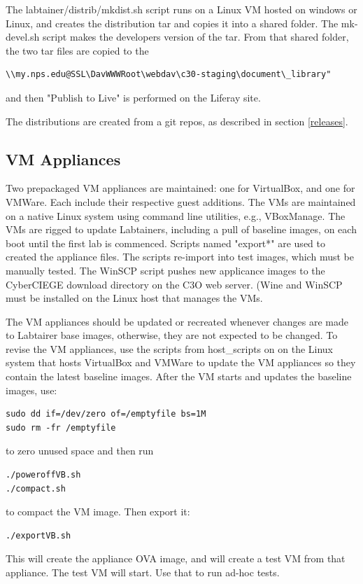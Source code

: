 \documentclass[12pt]{article}
\begin{document}
The labtainer/distrib/mkdist.sh script runs on a Linux VM hosted on windows or Linux, and creates the distribution tar 
and copies it into a shared folder.  The mk-devel.sh script makes the developers version of the tar.
From that shared folder, the two tar files are copied to the 
\begin{verbatim}
\\my.nps.edu@SSL\DavWWWRoot\webdav\c30-staging\document\_library" 
\end{verbatim}
\noindent and then "Publish to Live" is 
performed on the Liferay site.

The distributions are created from a git repos, as described in section \ref{releases}.

\subsection{VM Appliances}
Two prepackaged VM appliances are maintained: one for VirtualBox, and one for VMWare.  Each include
their respective guest additions.  The VMs are maintained on a native Linux system using command line
utilities, e.g., VBoxManage.  The VMs are rigged to update Labtainers, including a pull of
baseline images, on each boot until the first lab is commenced.  Scripts named "export*" are
used to created the appliance files.  The scripts re-import into test images, which must be
manually tested.  The WinSCP script pushes new applicance images to the CyberCIEGE download
directory on the C3O web server.  (Wine and WinSCP must be installed on the Linux host that
manages the VMs.

The VM appliances should be updated or recreated whenever changes are made to Labtairer base
images, otherwise, they are not expected to be changed.  To revise the VM appliances, use the scripts
from host\_scripts on 
on the Linux system that hosts VirtualBox and VMWare to update the VM appliances so they contain the latest baseline images.
After the VM starts and updates the baseline images, use:
\begin{verbatim}
sudo dd if=/dev/zero of=/emptyfile bs=1M
sudo rm -fr /emptyfile
\end{verbatim}
\noindent to zero unused space and then run
\begin{verbatim}
./poweroffVB.sh
./compact.sh
\end{verbatim}
\noindent to compact the VM image.  Then export it:
\begin{verbatim}
./exportVB.sh
\end{verbatim}
\noindent This will create the appliance OVA image, and will create a test
VM from that appliance.  The test VM will start.  Use that to run ad-hoc
tests.
\end{document}
